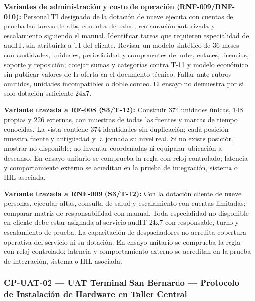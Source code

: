 \par\noindent\textbf{Variantes de administración y costo de operación (RNF-009/RNF-010):} Personal TI designado de la dotación de nueve ejecuta con cuentas de prueba las tareas de alta, consulta de salud, restauración autorizada y escalamiento siguiendo el manual. Identificar tareas que requieren especialidad de audIT, sin atribuirla a TI del cliente. Revisar un modelo sintético de 36 meses con cantidades, unidades, periodicidad y componentes de nube, enlaces, licencias, soporte y reposición; cotejar sumas y categorías contra T-11 y modelo económico sin publicar valores de la oferta en el documento técnico. Fallar ante rubros omitidos, unidades incompatibles o doble conteo. El ensayo no demuestra por sí solo dotación suficiente 24x7.\par\par





\par\noindent\textbf{Variante trazada a RF-008 (S3/T-12):} Construir 374 unidades únicas, 148 propias y 226 externas, con muestras de todas las fuentes y marcas de tiempo conocidas. La vista contiene 374 identidades sin duplicación; cada posición muestra fuente y antigüedad y la jornada su nivel real. Si no existe posición, mostrar no disponible; no inventar coordenadas ni equiparar ubicación a descanso. En ensayo unitario se comprueba la regla con reloj controlado; latencia y comportamiento externo se acreditan en la prueba de integración, sistema o HIL asociada.\par

\par\noindent\textbf{Variante trazada a RNF-009 (S3/T-12):} Con la dotación cliente de nueve personas, ejecutar altas, consulta de salud y escalamiento con cuentas limitadas; comparar matriz de responsabilidad con manual. Toda especialidad no disponible en cliente debe estar asignada al servicio audIT 24x7 con responsable, turno y escalamiento de prueba. La capacitación de despachadores no acredita cobertura operativa del servicio ni su dotación. En ensayo unitario se comprueba la regla con reloj controlado; latencia y comportamiento externo se acreditan en la prueba de integración, sistema o HIL asociada.\par
\subsubsection*{CP-UAT-02 — UAT Terminal San Bernardo — Protocolo de Instalación de Hardware en Taller Central}\label{sec:9-cp-uat-02}

